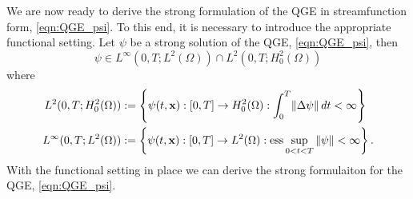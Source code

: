 We are now ready to derive the strong formulation of the QGE in streamfunction
form, \eqref{eqn:QGE_psi}. To this end, it is necessary to introduce the
appropriate functional setting.  Let $\psi$ be a strong solution \cite{Layton08}
of the QGE, \eqref{eqn:QGE_psi}, then
\begin{equation}
  \psi \in L^{\infty}(0, T; L^2(\Omega)) \cap L^2(0, T;H^2_0(\Omega))
  \label{eqn:StrongSpace}
\end{equation}
where
\begin{align*}
  L^2(0, T;H^2_0(\Omega)) &:= \left\{ \psi(t,\mathbf{x}):[0, T] \to H^2_0(\Omega):
    \int_{0}^{T}\! \|\Delta \psi\| \, dt < \infty \right\} \\
  L^{\infty}(0, T;L^2(\Omega)) &:= \left\{ \psi(t,\mathbf{x}):[0, T] \to L^2(\Omega):
    \operatorname{ess} \sup_{0<t<T} \|\psi\| < \infty\right\}.
\end{align*}
With the functional setting in place we can derive the strong formulaiton for
the QGE, \eqref{eqn:QGE_psi}.

